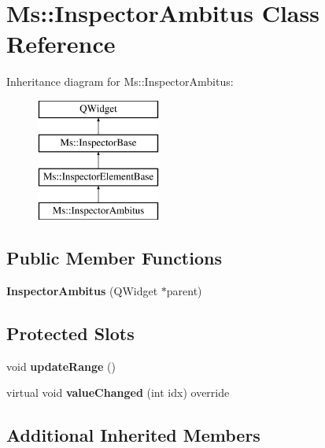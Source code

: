\hypertarget{class_ms_1_1_inspector_ambitus}{}\section{Ms\+:\+:Inspector\+Ambitus Class Reference}
\label{class_ms_1_1_inspector_ambitus}
Inheritance diagram for Ms\+:\+:Inspector\+Ambitus\+:\begin{figure}[H]
\begin{center}
\leavevmode
\includegraphics[height=4.000000cm]{class_ms_1_1_inspector_ambitus}
\end{center}
\end{figure}
\subsection*{Public Member Functions}
\begin{DoxyCompactItemize}
\item 
\mbox{\label{class_ms_1_1_inspector_ambitus_a86e9ccf7730aaa75b2b4cf074eeb4f0a}} 
{\bfseries Inspector\+Ambitus} (Q\+Widget $\ast$parent)
\end{DoxyCompactItemize}
\subsection*{Protected Slots}
\begin{DoxyCompactItemize}
\item 
\mbox{\label{class_ms_1_1_inspector_ambitus_ab53f3e465d398ec446011f5a9444d7b8}} 
void {\bfseries update\+Range} ()
\item 
\mbox{\label{class_ms_1_1_inspector_ambitus_a48437b32c58c08cdc42f192a4035aa9b}} 
virtual void {\bfseries value\+Changed} (int idx) override
\end{DoxyCompactItemize}
\subsection*{Additional Inherited Members}


